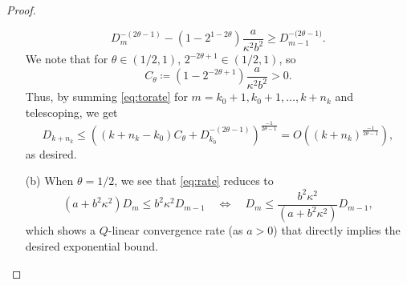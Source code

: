 \documentclass{article}
\newcommand{\alerttt}[1]{{#1}}
\theoremstyle{plain}
\theoremstyle{definition}
\theoremstyle{remark}
\begin{document}
\begin{proof}
\begin{enumerate}[leftmargin=*]
\begin{equation}
					D_m^{-(\alerttt{2\theta-1})} - (1 - 2^{\alerttt{1-2\theta}})
					\frac{a }{\alerttt{\kappa^2}b^2} \geq D_{m-1}^{-\alerttt{(
					2\theta-1})}.
					\label{eq:torate}
				\end{equation}
				We note that for $\theta \in \alerttt{(1/2,1)}$,
				$2^{\alerttt{-2\theta+1}}
				\in (1/2,1)$, so 
				\[
					C_\theta \coloneqq (1 - 2^{\alerttt{-2\theta+1}})
					\frac{a }{ \alerttt{\kappa^2}b^2} > 0.
				\]
				Thus, by summing \cref{eq:torate} for $m=k_0+1,
				k_0+1,\dotsc, k+n_k$ and telescoping,
				we get
				\[
					D_{k+n_k} \leq \left((k+n_k - k_0)
					C_\theta +
					D_{k_0}^{-(\alerttt{2\theta-1})}\right)^{\frac{-1}{\alerttt{2\theta-1}}}=
					O\left((k+n_k)^{\frac{-1}{\alerttt{2\theta-1}}}\right),
				\]
				as desired.

			\item[(b)] When $\theta = 1/2$, we see that \cref{eq:rate}
				reduces to
				\begin{equation}
					\left(a + b^2\alerttt{\kappa^2}\right) D_m \leq {b^2}\alerttt{\kappa^2} D_{m-1}
					\quad \Leftrightarrow \quad
					D_m \leq \frac{{b^2}\alerttt{\kappa^2}}{\left(a +
						{b^2}\alerttt{\kappa^2}\right)} D_{m-1},
				\label{eq:Qlinear}
				\end{equation}
				which shows a $Q$-linear convergence rate (as $a > 0$)
				that directly implies the desired exponential bound.
				

\end{enumerate}
\end{proof}
\end{document}
